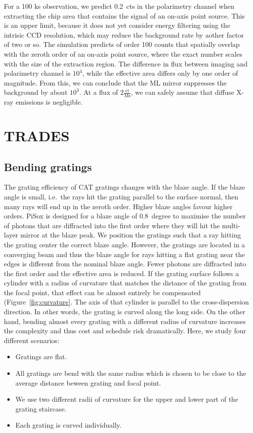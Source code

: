 \documentclass[]{spie}  %
\begin{document}
For a 100 ks observation, we predict 0.2~cts in the polarimetry
channel when extracting the chip area that contains the signal of an
on-axis point source. This is an upper limit, because it does not
yet consider energy filtering using the intrisic CCD resolution, which
may reduce the background rate by aother factor of two or so. The
simulation predicts of order 100 counts that spatially overlap with
the zeroth order of an on-axis point source, where the exact number
scales with the size of the extraction region. The difference in flux
between imaging and polarimetry channel is $10^4$, while the effective
area differs only by one order of magnitude. From this, we can
conclude that the ML mirror suppresses the background by about $10^3$.
At a flux of $2\frac{\mathrm{ct}}{\mathrm{Ms}}$, we can safely assume that
diffuse X-ray emissions is negligible.

\section{TRADES}
\label{sect:trades}

\subsection{Bending gratings}
\label{sect:bend}
The grating efficiency of CAT gratings changes with the blaze
angle. If the blaze angle is small, i.e.\ the rays hit the grating
parallel to the surface normal, then many rays will end up in the
zeroth order. Higher blaze angles favour higher orders. PiSox is
designed for a blaze angle of 0.8~degree to maximise the number of
photons that are diffracted into the first order where they will hit
the multi-layer mirror at the blaze peak. We position the gratings
such that a ray hitting the grating center the correct blaze
angle. However, the gratings are located in a converging beam and thus the blaze
angle for rays hitting a flat grating near the edges is different from
the nominal blaze angle. Fewer photons are diffracted into the first
order and the effective area is reduced.
If the grating surface
follows a cylinder with a radius of curvature that matches the
distance of the grating from the focal point, that effect can be
almost entirely be compensated (Figure~\ref{fig:curvature}. The axis
of that cylinder is parallel to the cross-dispersion direction. In
other words, the grating is curved along the long side. On the other
hand, bending almost every grating with a different radius of
curvature increases the complexity and thus cost and schedule risk
dramatically. Here, we study four different scenarios:
\begin{itemize}
    \item Gratings are flat.
    \item All gratings are bend with the same radius which is chosen to be close to the average distance beween grating and focal point.
    \item We use two different radii of curvature for the upper and lower part of the grating staircase.
    \item Each grating is curved individually.
\end{itemize}
\end{document}
